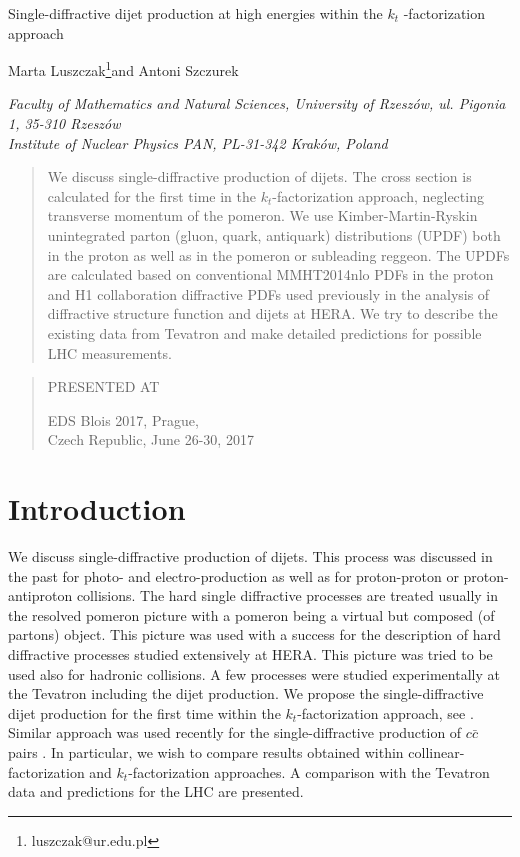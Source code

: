 \documentclass[12pt]{article}
\makeatletter
\newcommand\pubdate{\today}
\def\napoli{Faculty of Mathematics and Natural Sciences, University of Rzesz\'ow,
ul.  Pigonia 1, 35-310 Rzesz\'ow \\
Institute of Nuclear Physics PAN, PL-31-342 Krak\'ow, Poland}
\def\support{\footnote{luszczak@ur.edu.pl}}
\def\Title#1{\begin{center} {\Large #1 } \end{center}}
\def\Author#1{\begin{center}{ \sc #1} \end{center}}
\def\Address#1{\begin{center}{ \it #1} \end{center}}
\newcommand\pubblock{\rightline{\begin{tabular}{l} \\
         \pubdate  \end{tabular}}}
\newenvironment{Abstract}{\begin{quotation}  }{\end{quotation}}
\newenvironment{Presented}{\begin{quotation} \begin{center} 
             PRESENTED AT\end{center}\bigskip 
      \begin{center}\begin{large}}{\end{large}\end{center} \end{quotation}}
\makeatother
\begin{document}
\begin{titlepage}
\pubblock

\vfill
\Title{Single-diffractive dijet production at high energies within the $k_t$ -factorization approach}
\vfill
\Author{Marta Luszczak\support and Antoni Szczurek}
\Address{\napoli}
\vfill
\begin{Abstract}
We discuss single-diffractive production of dijets. The cross section is
calculated for the first time in 
the $k_t$-factorization approach, neglecting transverse momentum of the pomeron.
We use Kimber-Martin-Ryskin unintegrated parton (gluon, quark,
antiquark) distributions (UPDF) both in the proton as well as in the
pomeron or subleading reggeon.  The UPDFs are calculated based on 
conventional MMHT2014nlo PDFs in the proton and  H1 collaboration 
diffractive PDFs used previously in the analysis of diffractive 
structure function and dijets at HERA.  
We try to describe the existing data from Tevatron
and make detailed predictions for possible LHC measurements. 

\end{Abstract}
\vfill
\begin{Presented}
EDS Blois 2017, Prague, \\ Czech Republic, June 26-30, 2017
\end{Presented}
\vfill
\end{titlepage}
\def\thefootnote{\fnsymbol{footnote}}
\setcounter{footnote}{0}
%

\section{Introduction}

We discuss single-diffractive production of
dijets. This process was discussed in the past for photo- and
electro-production as well as for
proton-proton or proton-antiproton collisions.
The hard single diffractive processes are treated usually in the resolved pomeron
picture with a pomeron being a virtual but composed (of partons)
object. This picture was used with a success for the description of 
hard diffractive processes studied extensively at HERA.
This picture was tried to be used also for hadronic collisions. 
A few processes were studied experimentally at the Tevatron including the dijet production.
We propose the single-diffractive dijet 
production for the first time within the $k_t$-factorization approach,
see \cite{Luszczak:2017pna}.
Similar approach was used recently for the  single-diffractive
production of $c \bar c$ pairs \cite{Luszczak:2016csq}.
In particular, we wish to compare results 
obtained within collinear-factorization and $k_t$-factorization
approaches. A comparison with the Tevatron data and predictions for the LHC
are presented. 
\end{document}
